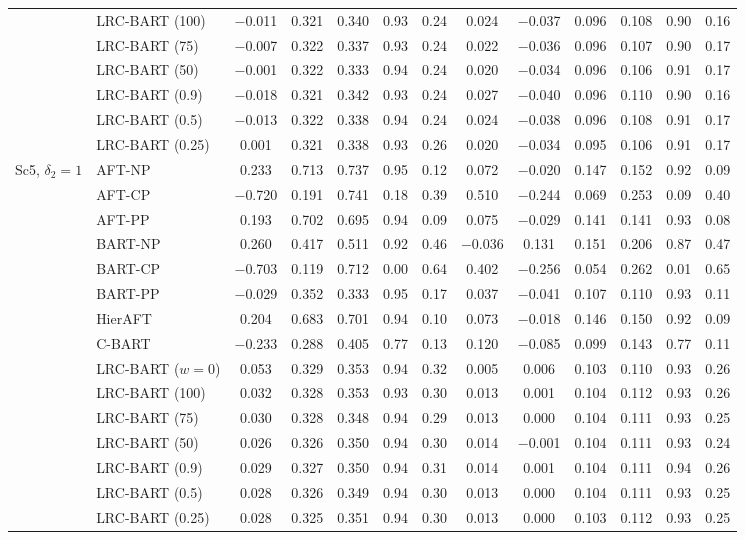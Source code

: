 \documentclass[11pt]{article}
\theoremstyle{definition}
\theoremstyle{plain}
\begin{document}
\begin{center}
\begin{longtable}{llccccccccccc}
& LRC-BART (100) & $-$0.011 & 0.321 & 0.340 & 0.93 & 0.24 & 0.024 & $-$0.037 & 0.096 & 0.108 & 0.90 & 0.16 \\
& LRC-BART (75) & $-$0.007 & 0.322 & 0.337 & 0.93 & 0.24 & 0.022 & $-$0.036 & 0.096 & 0.107 & 0.90 & 0.17 \\
& LRC-BART (50) & $-$0.001 & 0.322 & 0.333 & 0.94 & 0.24 & 0.020 & $-$0.034 & 0.096 & 0.106 & 0.91 & 0.17 \\
& LRC-BART (0.9) & $-$0.018 & 0.321 & 0.342 & 0.93 & 0.24 & 0.027 & $-$0.040 & 0.096 & 0.110 & 0.90 & 0.16 \\
& LRC-BART (0.5) & $-$0.013 & 0.322 & 0.338 & 0.94 & 0.24 & 0.024 & $-$0.038 & 0.096 & 0.108 & 0.91 & 0.17 \\
& LRC-BART (0.25) & 0.001 & 0.321 & 0.338 & 0.93 & 0.26 & 0.020 & $-$0.034 & 0.095 & 0.106 & 0.91 & 0.17 \\
\midrule
\multirow{15}{*}{Sc5, $\delta_2=1$} & AFT-NP & 0.233 & 0.713 & 0.737 & 0.95 & 0.12 & 0.072 & $-$0.020 & 0.147 & 0.152 & 0.92 & 0.09 \\
& AFT-CP & $-$0.720 & 0.191 & 0.741 & 0.18 & 0.39 & 0.510 & $-$0.244 & 0.069 & 0.253 & 0.09 & 0.40 \\
& AFT-PP & 0.193 & 0.702 & 0.695 & 0.94 & 0.09 & 0.075 & $-$0.029 & 0.141 & 0.141 & 0.93 & 0.08 \\
& BART-NP & 0.260 & 0.417 & 0.511 & 0.92 & 0.46 & $-$0.036 & 0.131 & 0.151 & 0.206 & 0.87 & 0.47 \\
& BART-CP & $-$0.703 & 0.119 & 0.712 & 0.00 & 0.64 & 0.402 & $-$0.256 & 0.054 & 0.262 & 0.01 & 0.65 \\
& BART-PP & $-$0.029 & 0.352 & 0.333 & 0.95 & 0.17 & 0.037 & $-$0.041 & 0.107 & 0.110 & 0.93 & 0.11 \\
& HierAFT & 0.204 & 0.683 & 0.701 & 0.94 & 0.10 & 0.073 & $-$0.018 & 0.146 & 0.150 & 0.92 & 0.09 \\
& C-BART & $-$0.233 & 0.288 & 0.405 & 0.77 & 0.13 & 0.120 & $-$0.085 & 0.099 & 0.143 & 0.77 & 0.11 \\
& LRC-BART ($w=0$) & 0.053 & 0.329 & 0.353 & 0.94 & 0.32 & 0.005 & 0.006 & 0.103 & 0.110 & 0.93 & 0.26 \\
& LRC-BART (100) & 0.032 & 0.328 & 0.353 & 0.93 & 0.30 & 0.013 & 0.001 & 0.104 & 0.112 & 0.93 & 0.26 \\
& LRC-BART (75) & 0.030 & 0.328 & 0.348 & 0.94 & 0.29 & 0.013 & 0.000 & 0.104 & 0.111 & 0.93 & 0.25 \\
& LRC-BART (50) & 0.026 & 0.326 & 0.350 & 0.94 & 0.30 & 0.014 & $-$0.001 & 0.104 & 0.111 & 0.93 & 0.24 \\
& LRC-BART (0.9) & 0.029 & 0.327 & 0.350 & 0.94 & 0.31 & 0.014 & 0.001 & 0.104 & 0.111 & 0.94 & 0.26 \\
& LRC-BART (0.5) & 0.028 & 0.326 & 0.349 & 0.94 & 0.30 & 0.013 & 0.000 & 0.104 & 0.111 & 0.93 & 0.25 \\
& LRC-BART (0.25) & 0.028 & 0.325 & 0.351 & 0.94 & 0.30 & 0.013 & 0.000 & 0.103 & 0.112 & 0.93 & 0.25 \\
\end{longtable}
\end{center}
\end{document}
